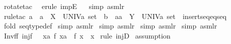 \begin{isabellebody}
\isamarkupfalse%
\ {\isacharparenleft}rotate{\isacharunderscore}tac\ {}{\isacharparenright}\isanewline
{}\isamarkupfalse%
\ {\isacharparenleft}erule\ impE{\isacharparenright}\isanewline
{}\isamarkupfalse%
\ {}\isanewline
{}\isamarkupfalse%
\ {\isacharparenleft}simp\ {\isacharparenleft}asm{\isacharunderscore}lr{\isacharparenright}{\isacharparenright}\isanewline
{}\isamarkupfalse%
\ {\isacharparenleft}rule{\isacharunderscore}tac\ a\ {\isacharequal}\ {\isachardoublequoteopen}a{\isachardoublequoteclose}\ \ X\ {\isacharequal}\ {\isachardoublequoteopen}UNIV{\isacharcolon}{\isacharcolon}{\isacharprime}a\ set{\isachardoublequoteclose}\ \ b\ {\isacharequal}\ {\isachardoublequoteopen}aa{\isachardoublequoteclose}\ \ Y\ {\isacharequal}\ {\isachardoublequoteopen}UNIV{\isacharcolon}{\isacharcolon}{\isacharprime}a\ set{\isachardoublequoteclose}\ \ insertseq{\isacharunderscore}eq{\isacharunderscore}seq{\isacharparenright}\isanewline
{}\isamarkupfalse%
\ {\isacharparenleft}fold\ seqtype{\isacharunderscore}def{\isacharparenright}\isanewline
{}\isamarkupfalse%
\ {\isacharparenleft}simp\ {\isacharparenleft}asm{\isacharunderscore}lr{\isacharparenright}{\isacharparenright}\isanewline
{}\isamarkupfalse%
\ {\isacharparenleft}simp\ {\isacharparenleft}asm{\isacharunderscore}lr{\isacharparenright}{\isacharparenright}\isanewline
{}\isamarkupfalse%
\ {\isacharparenleft}simp\ {\isacharparenleft}asm{\isacharunderscore}lr{\isacharparenright}{\isacharparenright}\isanewline
{}\isamarkupfalse%
\ {\isacharparenleft}simp\ {\isacharparenleft}asm{\isacharunderscore}lr{\isacharparenright}{\isacharparenright}\isanewline
{}\isamarkupfalse%
%
\endisatagproof
{\isafoldproof}%
%
\isadelimproof
\isanewline
%
\endisadelimproof
\isanewline
\isanewline
{}\isamarkupfalse%
\ Inv{\isacharunderscore}f{\isacharunderscore}f{\isacharcolon}\ {\isachardoublequoteopen}inj{\isacharparenleft}f{\isacharparenright}\ {\isacharequal}{\isacharequal}{\isachargreater}\ {\isacharparenleft}{\isacharat}\ xa{\isachardot}\ f\ xa\ {\isacharequal}\ f\ x{\isacharparenright}\ {\isacharequal}\ x{\isachardoublequoteclose}\isanewline
%
\isadelimproof
%
\endisadelimproof
%
\isatagproof
{}\isamarkupfalse%
\ {\isacharparenleft}rule\ injD{\isacharparenright}\isanewline
{}\isamarkupfalse%
\ assumption\isanewline
{}\isamarkupfalse%

\end{isabellebody}
